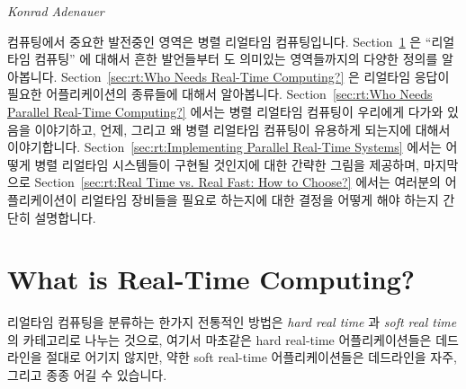
%
	 {\emph{Konrad Adenauer}}

컴퓨팅에서 중요한 발전중인 영역은 병렬 리얼타임 컴퓨팅입니다.
Section~\ref{sec:rt:What is Real-Time Computing?}
은 ``리얼타임 컴퓨팅'' 에 대해서 흔한 발언들부터 도 의미있는 영역들까지의
다양한 정의를 알아봅니다.
Section~\ref{sec:rt:Who Needs Real-Time Computing?}
은 리얼타임 응답이 필요한 어플리케이션의 종류들에 대해서 알아봅니다.
Section~\ref{sec:rt:Who Needs Parallel Real-Time Computing?}
에서는 병렬 리얼타임 컴퓨팅이 우리에게 다가와 있음을 이야기하고, 언제, 그리고
왜 병렬 리얼타임 컴퓨팅이 유용하게 되는지에 대해서 이야기합니다.
Section~\ref{sec:rt:Implementing Parallel Real-Time Systems}
에서는 어떻게 병렬 리얼타임 시스템들이 구현될 것인지에 대한 간략한 그림을
제공하며, 마지막으로
Section~\ref{sec:rt:Real Time vs. Real Fast: How to Choose?}
에서는 여러분의 어플리케이션이 리얼타임 장비들을 필요로 하는지에 대한 결정을
어떻게 해야 하는지 간단히 설명합니다.

\section{What is Real-Time Computing?}
\label{sec:rt:What is Real-Time Computing?}

리얼타임 컴퓨팅을 분류하는 한가지 전통적인 방법은 \emph{hard real time} 과
\emph{soft real time} 의 카테고리로 나누는 것으로, 여기서 마초같은 hard
real-time 어플리케이션들은 데드라인을 절대로 어기지 않지만, 약한 soft real-time
어플리케이션들은 데드라인을 자주, 그리고 종종 어길 수 있습니다.
\iffalse

